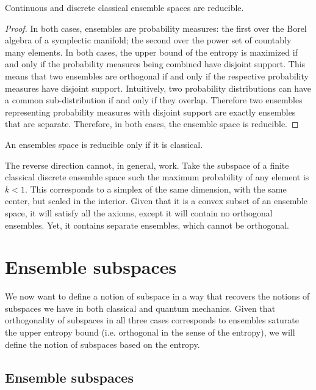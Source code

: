 \begin{prop}
	Continuous and discrete classical ensemble spaces are reducible.
\end{prop}

\begin{proof}
	In both cases, ensembles are probability measures: the first over the Borel algebra of a symplectic manifold; the second over the power set of countably many elements. In both cases, the upper bound of the entropy is maximized if and only if the probability measures being combined have disjoint support. This means that two ensembles are orthogonal if and only if the respective probability measures have disjoint support. Intuitively, two probability distributions can have a common sub-distribution if and only if they overlap. Therefore two ensembles representing probability measures with disjoint support are exactly ensembles that are separate. Therefore, in both cases, the ensemble space is reducible.
\end{proof}

\begin{conj}
	An ensembles space is reducible only if it is classical.
\end{conj}

\begin{remark}
	The reverse direction cannot, in general, work. Take the subspace of a finite classical discrete ensemble space such the maximum probability of any element is $k < 1$. This corresponds to a simplex of the same dimension, with the same center, but scaled in the interior. Given that it is a convex subset of an ensemble space, it will satisfy all the axioms, except it will contain no orthogonal ensembles. Yet, it contains separate ensembles, which cannot be orthogonal.
\end{remark}

\section{Ensemble subspaces}

We now want to define a notion of subspace in a way that recovers the notions of subspaces we have in both classical and quantum mechanics. Given that orthogonality of subspaces in all three cases corresponds to ensembles saturate the upper entropy bound (i.e. orthogonal in the sense of the entropy), we will define the notion of subspaces based on the entropy.
\subsection{Ensemble subspaces}

